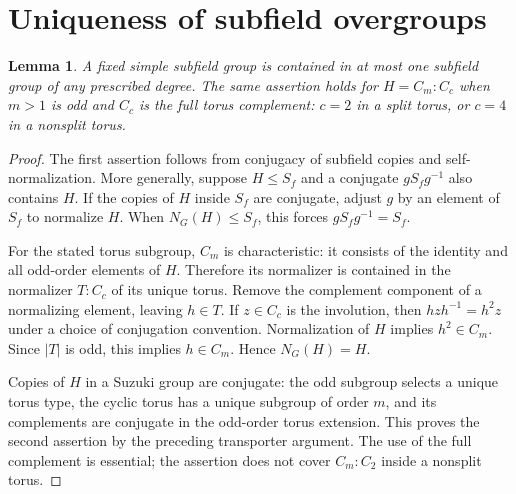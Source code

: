 \documentclass[11pt,a4paper]{article}
\newtheorem{lemma}{Lemma}\newtheorem{theorem}[lemma]{Theorem}
\begin{document}
\section{Uniqueness of subfield overgroups}
\begin{lemma}\label{unique}
A fixed simple subfield group is contained in at most one subfield
group of any prescribed degree. The same assertion holds for
$H=C_m:C_c$ when $m>1$ is odd and $C_c$ is the full torus complement:
$c=2$ in a split torus, or $c=4$ in a nonsplit torus.
\end{lemma}
\begin{proof}
The first assertion follows from conjugacy of subfield copies and
self-normalization. More generally, suppose $H\le S_f$ and a conjugate
$gS_fg^{-1}$ also contains $H$. If the copies of $H$ inside $S_f$
are conjugate, adjust $g$ by an element of $S_f$ to normalize $H$.
When $N_G(H)\le S_f$, this forces $gS_fg^{-1}=S_f$.

For the stated torus subgroup, $C_m$ is characteristic: it consists
of the identity and all odd-order elements of $H$. Therefore its
normalizer is contained in the normalizer $T:C_c$ of its unique torus.
Remove the complement component of a normalizing element, leaving
$h\in T$. If $z\in C_c$ is the involution, then
$hzh^{-1}=h^2z$ under a choice of conjugation convention.
Normalization of $H$ implies $h^2\in C_m$. Since $|T|$ is odd,
this implies $h\in C_m$. Hence $N_G(H)=H$.

Copies of $H$ in a Suzuki group are conjugate: the odd subgroup
selects a unique torus type, the cyclic torus has a unique subgroup
of order $m$, and its complements are conjugate in the odd-order
torus extension. This proves the second assertion by the preceding
transporter argument. The use of the full complement is essential;
the assertion does not cover $C_m:C_2$ inside a nonsplit torus.
\end{proof}
\end{document}

